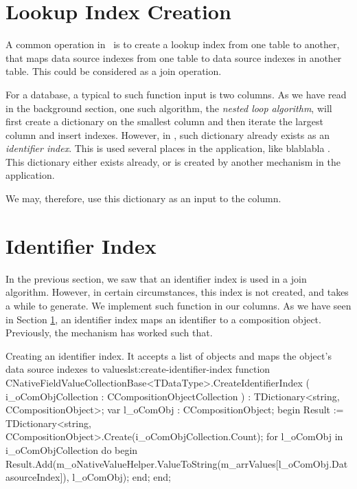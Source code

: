 \section{Lookup Index Creation}
\label{sec:Lookup Index Creation}
A common operation in \bd~is to create a lookup index from one table to another, that maps data source indexes from one table to data source indexes in another table. This could be considered as a join operation.

For a database, a typical to such function input is two columns. As we have read in the background section, one such algorithm, the \textit{nested loop algorithm}, will first create a dictionary on the smallest column and then iterate the largest column and insert indexes. However, in \gap, such dictionary already exists as an \textit{identifier index}. This is used several places in the application, like blablabla . This dictionary either exists already, or is created by another mechanism in the application.

We may, therefore, use this dictionary as an input to the column.

\section{Identifier Index}
\label{sec:Identifier Index}
In the previous section, we saw that an identifier index is used in a join algorithm. However, in certain circumstances, this index is not created, and takes a while to generate. We implement such function in our columns. As we have seen in Section \ref{sec:Lookup Index Creation}, an identifier index maps an identifier to a composition object. Previously, the mechanism has worked such that.

\begin{delphicode}{Creating an identifier index. It accepts a list of objects and maps the object's data source indexes to values}{lst:create-identifier-index}
function CNativeFieldValueCollectionBase<TDataType>.CreateIdentifierIndex
( i_oComObjCollection : CCompositionObjectCollection )
: TDictionary<string, CCompositionObject>;
var
  l_oComObj : CCompositionObject;
begin
  Result := TDictionary<string, CCompositionObject>.Create(i_oComObjCollection.Count);
  for l_oComObj in i_oComObjCollection do
  begin
    Result.Add(m_oNativeValueHelper.ValueToString(m_arrValues[l_oComObj.DatasourceIndex]), l_oComObj);
  end;
end;
\end{delphicode}

